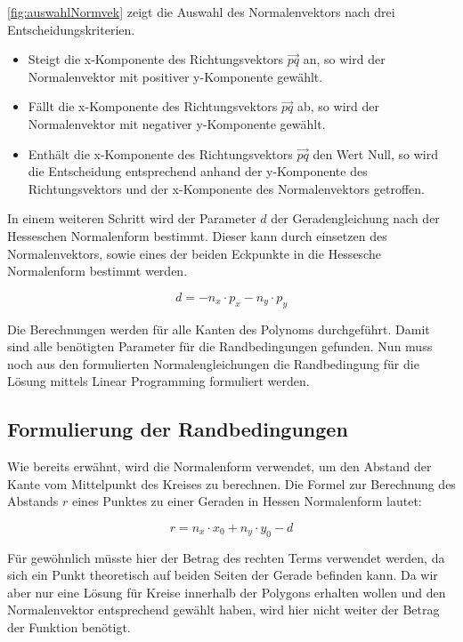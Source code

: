 \documentclass[12pt]{scrartcl}
\begin{document}
\autoref{fig:auswahlNormvek} zeigt die Auswahl des Normalenvektors nach drei Entscheidungskriterien.
\begin{itemize}
    \item Steigt die x-Komponente des Richtungsvektors $\vec{pq}$ an, so wird der Normalenvektor mit positiver y-Komponente gewählt.
    \item Fällt die x-Komponente des Richtungsvektors $\vec{pq}$ ab, so wird der Normalenvektor mit negativer y-Komponente gewählt.
    \item Enthält die x-Komponente des Richtungsvektors $\vec{pq}$ den Wert Null, so wird die Entscheidung entsprechend anhand der y-Komponente des Richtungsvektors und der x-Komponente des Normalenvektors getroffen.
\end{itemize}

In einem weiteren Schritt wird der Parameter $d$ der Geradengleichung nach der Hesseschen Normalenform bestimmt.
Dieser kann durch einsetzen des Normalenvektors, sowie eines der beiden Eckpunkte in die Hessesche Normalenform bestimmt werden.

\begin{equation}
    d = -n_x \cdot p_x - n_y \cdot p_y
\end{equation}

Die Berechnungen werden für alle Kanten des Polynoms durchgeführt.
Damit sind alle benötigten Parameter für die Randbedingungen gefunden.
Nun muss noch aus den formulierten Normalengleichungen die Randbedingung für die Lösung mittels Linear Programming formuliert werden.

\subsection{Formulierung der Randbedingungen}
Wie bereits erwähnt, wird die Normalenform verwendet, um den Abstand der Kante vom Mittelpunkt des Kreises zu berechnen. Die Formel zur Berechnung des Abstands $r$ eines Punktes zu einer Geraden in Hessen Normalenform lautet:

\begin{equation}
    r = n_x \cdot x_0 + n_y \cdot y_0 - d
\end{equation}

Für gewöhnlich müsste hier der Betrag des rechten Terms verwendet werden, da sich ein Punkt theoretisch auf beiden Seiten der Gerade befinden kann. Da wir aber nur eine Lösung für Kreise innerhalb der Polygons erhalten wollen und den Normalenvektor entsprechend gewählt haben, wird hier nicht weiter der Betrag der Funktion benötigt.
\end{document}
